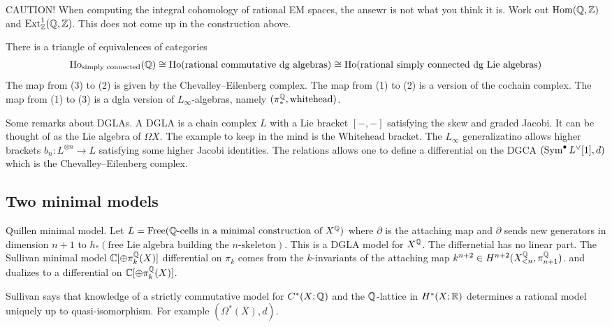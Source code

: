 \documentclass[12pt]{article}
\begin{document}
CAUTION! When computing the integral cohomology of rational EM spaces, the ansewr is not what you think it is. Work out $\Hom(\Q,\Z)$ and $\Ext^1_\Z(\Q,\Z)$. This does not come up in the construction above.

\begin{theorem}
    There is a triangle of equivalences of categories \begin{align*}
    \operatorname{Ho}_{\text{simply connected}}(\Q) \cong \operatorname{Ho}(\text{rational commutative dg algebras})\cong \operatorname{Ho}(\text{rational simply connected dg Lie algebras})
\end{align*} The map from (3) to (2) is given by the Chevalley--Eilenberg complex. The map from (1) to (2) is a version of the cochain complex. The map from (1) to (3) is a dgla version of $L_\infty$-algebras, namely $(\pi_*^{\Q},\text{whitehead})$.
\end{theorem}

Some remarks about DGLAs. A DGLA is a chain complex $L$ with a Lie bracket $[-,-]$ satisfying the skew and graded Jacobi. It can be thought of as the Lie algebra of $\Omega X$. The example to keep in the mind is the Whitehead bracket. The $L_\infty$ generalizatino allows higher brackets $b_n:L^{\otimes n} \to L$ satisfying some higher Jacobi identities. The relations allows one to define a differential on the DGCA $(\Sym^\bullet L^\vee[1],d)$ which is the Chevalley--Eilenberg complex. 

\subsection{Two minimal models}
Quillen minimal model. Let $L = \operatorname{Free}(\text{$\Q$-cells in a minimal construction of $X^\Q$})$ where $\partial$ is the attaching map and $\partial$ sends new generators in dimension $n+1$ to $h_*(\text{free Lie algebra building the $n$-skeleton})$. This is a DGLA model for $X^\Q$. The differnetial has no linear part. The Sullivan minimal model $\C[\oplus \pi^\Q_k(X)]$ differential on $\pi_k$ comes from the $k$-invariants of the attaching map $k^{n+2} \in H^{n+2}(X_{<n}^\Q,\pi_{n+1}^\Q)$. and dualizes to a differential on $\C[\oplus \pi^\Q_k(X)]$. 

Sullivan says that knowledge of a strictly commutative model for $C^*(X;\Q)$ and the $\Q$-lattice in $H^*(X;\R)$ determines a rational model uniquely up to quasi-isomorphism. For example $(\Omega^*(X),d)$.
\end{document}
